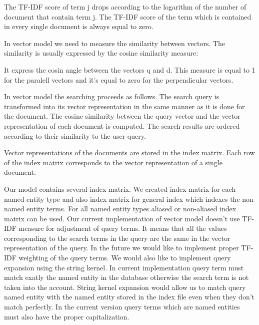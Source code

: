 
The TF-IDF score of term j drops according to the logarithm of the number of document that contain term j. The TF-IDF score of the term which is contained in every single document is always equal to zero.


In vector model we need to measure the similarity between vectors. The similarity is usually expressed by the cosine similarity measure:


It express the cosin angle between the vectors q and d. This measure is equal to 1 for the paralell vectors and it's equal to zero for the perpendicular vectors.

In vector model the searching proceeds as follows. The search query is transformed into its vector representation in the same manner as it is done for the document. The cosine similarity between the query vector and the vector representation of each document is computed. The search results are ordered according to their similarity to the user query.  

Vector representations of the documents are stored in the index matrix. Each row of the index matrix corresponds to the vector representation of a single document. 

Our model contains several index matrix. We created index matrix for each named entity type and also index matrix for general index which indexes the non named entity terms. For all named entity types aliased or non-aliased index matrix can be used. Our current implementation of vector model doesn't use TF-IDF measure for adjustment of query terms. It means that all the values corresponding to the search terms in the query are the same in the vector representation of the query. In the future we would like to implement proper TF-IDF weighting of the query terms. We would also like to implement query expansion using the string kernel. In current implementation query term must match exatly the named entity in the database otherwise the search term is not taken into the account. String kernel expansion would allow us to match query named entity with the named entity stored in the index file even when they don't match perfectly. In the current version query terms which are named entities must also have the proper capitalization.

